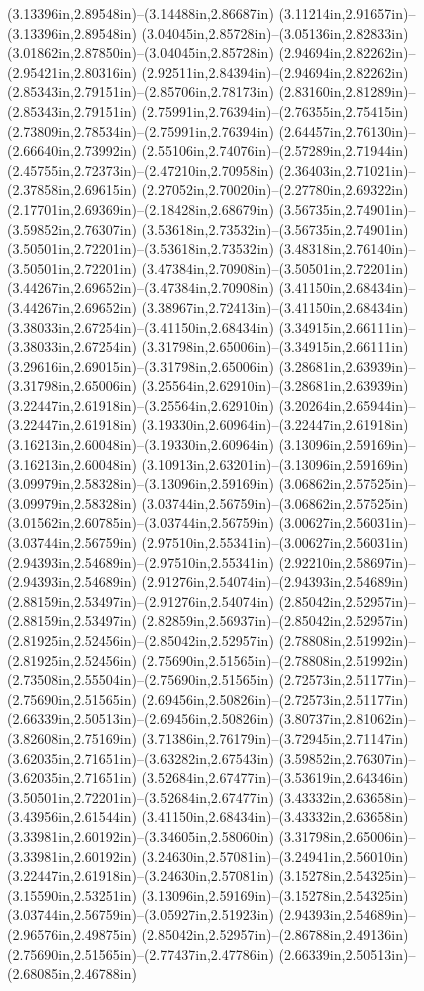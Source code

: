 (3.13396in,2.89548in)--(3.14488in,2.86687in) (3.11214in,2.91657in)--(3.13396in,2.89548in) (3.04045in,2.85728in)--(3.05136in,2.82833in) (3.01862in,2.87850in)--(3.04045in,2.85728in) (2.94694in,2.82262in)--(2.95421in,2.80316in) (2.92511in,2.84394in)--(2.94694in,2.82262in) (2.85343in,2.79151in)--(2.85706in,2.78173in) (2.83160in,2.81289in)--(2.85343in,2.79151in) (2.75991in,2.76394in)--(2.76355in,2.75415in) (2.73809in,2.78534in)--(2.75991in,2.76394in) (2.64457in,2.76130in)--(2.66640in,2.73992in) (2.55106in,2.74076in)--(2.57289in,2.71944in) (2.45755in,2.72373in)--(2.47210in,2.70958in) (2.36403in,2.71021in)--(2.37858in,2.69615in) (2.27052in,2.70020in)--(2.27780in,2.69322in) (2.17701in,2.69369in)--(2.18428in,2.68679in) (3.56735in,2.74901in)--(3.59852in,2.76307in) (3.53618in,2.73532in)--(3.56735in,2.74901in) (3.50501in,2.72201in)--(3.53618in,2.73532in) (3.48318in,2.76140in)--(3.50501in,2.72201in) (3.47384in,2.70908in)--(3.50501in,2.72201in) (3.44267in,2.69652in)--(3.47384in,2.70908in) (3.41150in,2.68434in)--(3.44267in,2.69652in) (3.38967in,2.72413in)--(3.41150in,2.68434in) (3.38033in,2.67254in)--(3.41150in,2.68434in) (3.34915in,2.66111in)--(3.38033in,2.67254in) (3.31798in,2.65006in)--(3.34915in,2.66111in) (3.29616in,2.69015in)--(3.31798in,2.65006in) (3.28681in,2.63939in)--(3.31798in,2.65006in) (3.25564in,2.62910in)--(3.28681in,2.63939in) (3.22447in,2.61918in)--(3.25564in,2.62910in) (3.20264in,2.65944in)--(3.22447in,2.61918in) (3.19330in,2.60964in)--(3.22447in,2.61918in) (3.16213in,2.60048in)--(3.19330in,2.60964in) (3.13096in,2.59169in)--(3.16213in,2.60048in) (3.10913in,2.63201in)--(3.13096in,2.59169in) (3.09979in,2.58328in)--(3.13096in,2.59169in) (3.06862in,2.57525in)--(3.09979in,2.58328in) (3.03744in,2.56759in)--(3.06862in,2.57525in) (3.01562in,2.60785in)--(3.03744in,2.56759in) (3.00627in,2.56031in)--(3.03744in,2.56759in) (2.97510in,2.55341in)--(3.00627in,2.56031in) (2.94393in,2.54689in)--(2.97510in,2.55341in) (2.92210in,2.58697in)--(2.94393in,2.54689in) (2.91276in,2.54074in)--(2.94393in,2.54689in) (2.88159in,2.53497in)--(2.91276in,2.54074in) (2.85042in,2.52957in)--(2.88159in,2.53497in) (2.82859in,2.56937in)--(2.85042in,2.52957in) (2.81925in,2.52456in)--(2.85042in,2.52957in) (2.78808in,2.51992in)--(2.81925in,2.52456in) (2.75690in,2.51565in)--(2.78808in,2.51992in) (2.73508in,2.55504in)--(2.75690in,2.51565in) (2.72573in,2.51177in)--(2.75690in,2.51565in) (2.69456in,2.50826in)--(2.72573in,2.51177in) (2.66339in,2.50513in)--(2.69456in,2.50826in) (3.80737in,2.81062in)--(3.82608in,2.75169in) (3.71386in,2.76179in)--(3.72945in,2.71147in) (3.62035in,2.71651in)--(3.63282in,2.67543in) (3.59852in,2.76307in)--(3.62035in,2.71651in) (3.52684in,2.67477in)--(3.53619in,2.64346in) (3.50501in,2.72201in)--(3.52684in,2.67477in) (3.43332in,2.63658in)--(3.43956in,2.61544in) (3.41150in,2.68434in)--(3.43332in,2.63658in) (3.33981in,2.60192in)--(3.34605in,2.58060in) (3.31798in,2.65006in)--(3.33981in,2.60192in) (3.24630in,2.57081in)--(3.24941in,2.56010in) (3.22447in,2.61918in)--(3.24630in,2.57081in) (3.15278in,2.54325in)--(3.15590in,2.53251in) (3.13096in,2.59169in)--(3.15278in,2.54325in) (3.03744in,2.56759in)--(3.05927in,2.51923in) (2.94393in,2.54689in)--(2.96576in,2.49875in) (2.85042in,2.52957in)--(2.86788in,2.49136in) (2.75690in,2.51565in)--(2.77437in,2.47786in) (2.66339in,2.50513in)--(2.68085in,2.46788in) 